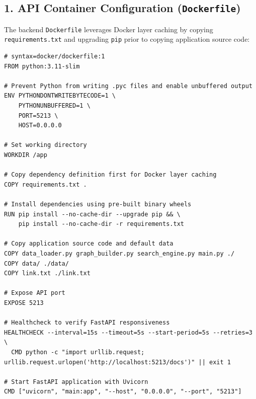 \documentclass[11pt,a4paper]{article}
\begin{document}
\subsection{1. API Container Configuration (\texttt{Dockerfile})}
The backend \texttt{Dockerfile} leverages Docker layer caching by copying \texttt{requirements.txt} and upgrading \texttt{pip} prior to copying application source code:
\begin{lstlisting}[language=docker, caption={\texttt{Dockerfile}: Production container definition for \texttt{proximity-api}.}]
# syntax=docker/dockerfile:1
FROM python:3.11-slim

# Prevent Python from writing .pyc files and enable unbuffered output
ENV PYTHONDONTWRITEBYTECODE=1 \
    PYTHONUNBUFFERED=1 \
    PORT=5213 \
    HOST=0.0.0.0

# Set working directory
WORKDIR /app

# Copy dependency definition first for Docker layer caching
COPY requirements.txt .

# Install dependencies using pre-built binary wheels
RUN pip install --no-cache-dir --upgrade pip && \
    pip install --no-cache-dir -r requirements.txt

# Copy application source code and default data
COPY data_loader.py graph_builder.py search_engine.py main.py ./
COPY data/ ./data/
COPY link.txt ./link.txt

# Expose API port
EXPOSE 5213

# Healthcheck to verify FastAPI responsiveness
HEALTHCHECK --interval=15s --timeout=5s --start-period=5s --retries=3 \
  CMD python -c "import urllib.request; urllib.request.urlopen('http://localhost:5213/docs')" || exit 1

# Start FastAPI application with Uvicorn
CMD ["uvicorn", "main:app", "--host", "0.0.0.0", "--port", "5213"]
\end{lstlisting}
\end{document}
